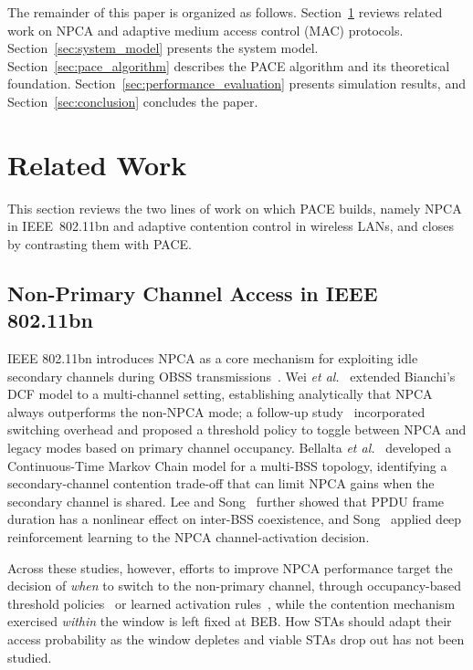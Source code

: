 \documentclass[conference]{IEEEtran}
\begin{document}
The remainder of this paper is organized as follows. Section~\ref{sec:related_work} reviews related work on NPCA and adaptive medium access control (MAC) protocols. Section~\ref{sec:system_model} presents the system model. Section~\ref{sec:pace_algorithm} describes the PACE algorithm and its theoretical foundation. Section~\ref{sec:performance_evaluation} presents simulation results, and Section~\ref{sec:conclusion} concludes the paper.

\section{Related Work}
\label{sec:related_work}

This section reviews the two lines of work on which PACE builds, namely
NPCA in IEEE~802.11bn and adaptive contention control in wireless LANs, and
closes by contrasting them with PACE.

\subsection{Non-Primary Channel Access in IEEE 802.11bn}

IEEE 802.11bn introduces NPCA as a core mechanism for exploiting idle
secondary channels during OBSS transmissions~\cite{ieee80211bn,galati2024will}.
Wei \textit{et al.}~\cite{wei2024non} extended Bianchi's DCF model to a
multi-channel setting, establishing analytically that NPCA always outperforms
the non-NPCA mode; a follow-up study~\cite{wei2024optimized} incorporated
switching overhead and proposed a threshold policy to toggle between NPCA
and legacy modes based on primary channel occupancy. Bellalta
\textit{et al.}~\cite{bellalta2025performance} developed a Continuous-Time
Markov Chain model for a multi-BSS topology, identifying a secondary-channel
contention trade-off that can limit NPCA gains when the secondary channel
is shared. Lee and Song~\cite{lee2024impact} further showed that PPDU frame
duration has a nonlinear effect on inter-BSS coexistence, and Song~\cite{song2026adaptive}
applied deep reinforcement learning to the NPCA channel-activation decision.

Across these studies, however, efforts to improve NPCA performance target
the decision of \emph{when} to switch to the non-primary channel, through
occupancy-based threshold policies~\cite{wei2024optimized} or learned
activation rules~\cite{song2026adaptive}, while the contention mechanism
exercised \emph{within} the window is left fixed at BEB. How STAs should
adapt their access probability as the window depletes and viable STAs
drop out has not been studied.
\end{document}
